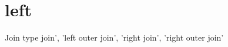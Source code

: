 \hypertarget{left-example}{\section{left}
}
Join type join', 'left outer join', 'right join', 'right outer join'


\begin{DoxyCodeInclude}
\end{DoxyCodeInclude}
 